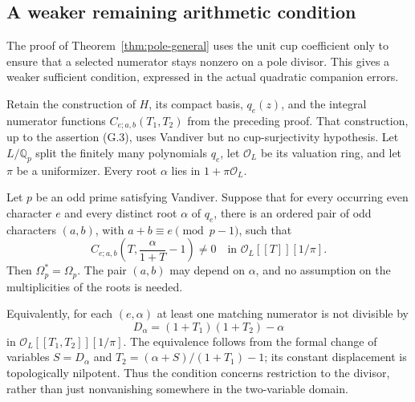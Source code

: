 \subsection{A weaker remaining arithmetic condition}
\label{sec:pole-nonvanishing}

The proof of Theorem~\ref{thm:pole-general} uses the unit cup coefficient only to ensure that a selected numerator stays nonzero on a pole divisor. This gives a weaker sufficient condition, expressed in the actual quadratic companion errors.

Retain the construction of $H$, its compact basis, $q_e(z)$, and the integral numerator functions $C_{e;a,b}(T_1,T_2)$ from the preceding proof. That construction, up to the assertion (G.3), uses Vandiver but no cup-surjectivity hypothesis. Let $L/\mathbb Q_p$ split the finitely many polynomials $q_e$, let $\mathcal O_L$ be its valuation ring, and let $\pi$ be a uniformizer. Every root $\alpha$ lies in $1+\pi\mathcal O_L$.

\begin{theorem}[K17-POLE-NV]\label{thm:pole-nv}
Let $p$ be an odd prime satisfying Vandiver. Suppose that for every occurring even character $e$ and every distinct root $\alpha$ of $q_e$, there is an ordered pair of odd characters $(a,b)$, with $a+b\equiv e\pmod{p-1}$, such that
\[
 C_{e;a,b}\!\left(T,\frac{\alpha}{1+T}-1\right)\ne0
 \quad\text{in }\mathcal O_L[[T]][1/\pi].                    \tag{NV}
\]
Then $\Omega_p^*=\Omega_p$. The pair $(a,b)$ may depend on $\alpha$, and no assumption on the multiplicities of the roots is needed.
\end{theorem}

Equivalently, for each $(e,\alpha)$ at least one matching numerator is not divisible by
\[
 D_\alpha=(1+T_1)(1+T_2)-\alpha
\]
in $\mathcal O_L[[T_1,T_2]][1/\pi]$. The equivalence follows from the formal change of variables $S=D_\alpha$ and $T_2=(\alpha+S)/(1+T_1)-1$; its constant displacement is topologically nilpotent. Thus the condition concerns restriction to the divisor, rather than just nonvanishing somewhere in the two-variable domain.

